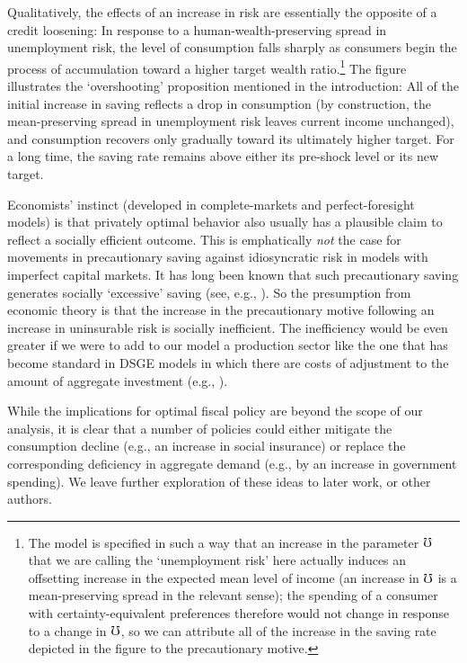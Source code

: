 \documentclass[titlepage]{\econtex}
\begin{document}
Qualitatively, the effects of an increase in risk are essentially the opposite
of a credit loosening: In response to a human-wealth-preserving spread in unemployment risk, the level of
consumption falls sharply as consumers begin the process of
accumulation toward a higher target wealth ratio.\footnote{The model
  is specified in such a way that an increase in the parameter
  $\mho$ that we are calling the `unemployment risk' here actually
  induces an offsetting increase in the expected mean level of income
  (an increase in $\mho$ is a mean-preserving spread in the relevant
  sense); the spending of a consumer with certainty-equivalent
  preferences therefore would not change in response to a change in
  $\mho$, so we can attribute all of the increase in the saving rate
  depicted in the figure to the precautionary motive.}  The figure illustrates the `overshooting' proposition mentioned in the introduction: All of the initial increase in saving reflects a drop in consumption (by construction, the mean-preserving spread in unemployment risk leaves current income unchanged), and consumption recovers only gradually toward its ultimately higher target.  For a long time, the saving rate remains above either its pre-shock level or its new target.


Economists' instinct (developed in complete-markets and
perfect-foresight models) is that privately optimal behavior also
usually has a plausible claim to reflect a socially efficient
outcome.  This is emphatically {\it not} the case for movements in
precautionary saving against idiosyncratic risk in models with imperfect capital markets.  It has
long been known that such precautionary saving generates socially `excessive'
saving (see, e.g., \cite{aiyagari:opttax}).  So the presumption from
economic theory is that the increase in the precautionary motive
following an increase in uninsurable risk is socially inefficient.
The inefficiency would be even greater if we were to add to our model
a production sector like the one that has become standard in DSGE
models in which there are costs of adjustment to the amount of
aggregate investment (e.g., \cite{cee:habits}).

While the implications for optimal fiscal policy are beyond the scope
of our analysis, it is clear that a number of policies could either
mitigate the consumption decline (e.g., an increase in social
insurance) or replace the corresponding deficiency in aggregate demand
(e.g., by an increase in government spending).  We leave further
exploration of these ideas to later work, or other authors.
\end{document}
